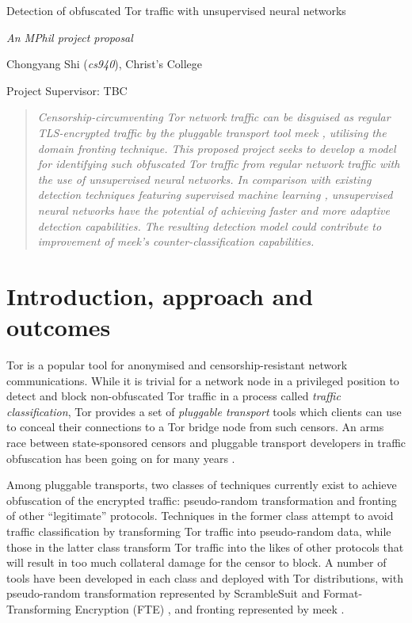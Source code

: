 \documentclass[11pt]{article}
\begin{document}
\centerline{\Large Detection of obfuscated Tor traffic with unsupervised neural networks}
\vspace{2em}
\centerline{\Large \emph{An MPhil project proposal}}
\vspace{2em}
\centerline{\large Chongyang Shi (\emph{cs940}), Christ's College}
\vspace{1em}
\centerline{\large Project Supervisor: TBC}
\vspace{1em}

\begin{abstract}
\textsl{Censorship-circumventing Tor network traffic can be disguised as regular TLS-encrypted traffic by the pluggable transport tool \emph{meek} \cite{fifield2015blocking}, utilising the \emph{domain fronting} technique. This proposed project seeks to develop a model for identifying such obfuscated Tor traffic from regular network traffic with the use of unsupervised neural networks. In comparison with existing detection techniques featuring supervised machine learning \cite[Sec. 6]{wang2015seeing}, unsupervised neural networks have the potential of achieving faster and more adaptive detection capabilities. The resulting detection model could contribute to improvement of meek's counter-classification capabilities.} 
\end{abstract}

\section{Introduction, approach and outcomes}

Tor is a popular tool for anonymised and censorship-resistant network communications. While it is trivial for a network node in a privileged position to detect and block non-obfuscated Tor traffic \cite[Tb. 6] {bujlow2015independent} in a process called \emph{traffic classification}, Tor provides a set of \emph{pluggable transport} tools which clients can use to conceal their connections to a Tor bridge node from such censors. An arms race between state-sponsored censors and pluggable transport developers in traffic obfuscation has been going on for many years \cite{khattak2014systemization}. 

Among pluggable transports, two classes of techniques currently exist to achieve obfuscation of the encrypted traffic: pseudo-random transformation and fronting of other ``legitimate'' protocols. Techniques in the former class attempt to avoid traffic classification by transforming Tor traffic into pseudo-random data, while those in the latter class transform Tor traffic into the likes of other protocols that will result in too much collateral damage for the censor to block. A number of tools have been developed in each class and deployed with Tor distributions, with pseudo-random transformation represented by ScrambleSuit \cite{winter2013scramblesuit} and Format-Transforming Encryption (FTE) \cite{dyer2013protocol}, and fronting represented by meek \cite{fifield2015blocking}. 
\end{document}
